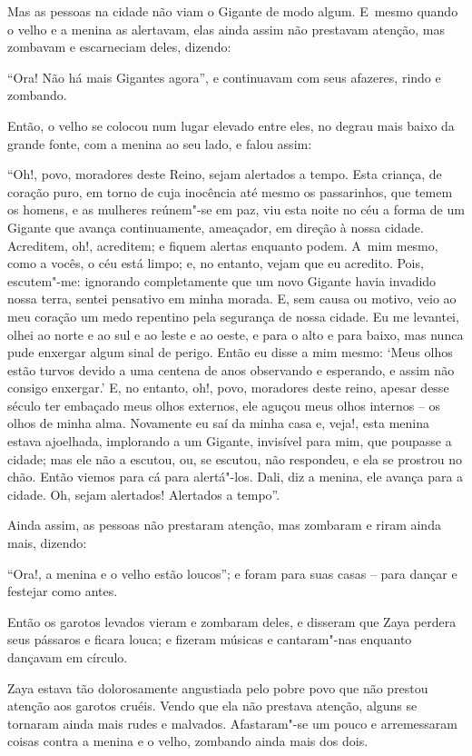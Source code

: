 Mas as pessoas na cidade não viam o Gigante de modo algum. E~mesmo quando o
velho e a menina as alertavam, elas ainda assim não prestavam atenção,
mas zombavam e escarneciam deles, dizendo:

``Ora! Não há mais Gigantes agora'', e continuavam com seus afazeres,
rindo e zombando.

Então, o velho se colocou num lugar elevado entre eles, no degrau mais
baixo da grande fonte, com a menina ao seu lado, e falou assim:

``Oh!, povo, moradores deste Reino, sejam alertados a tempo. Esta
criança, de coração puro, em torno de cuja inocência até mesmo os
passarinhos, que temem os homens, e as mulheres reúnem"-se em paz, viu
esta noite no céu a forma de um Gigante que avança continuamente,
ameaçador, em direção à nossa cidade. Acreditem, oh!, acreditem; e
fiquem alertas enquanto podem. A~mim mesmo, como a vocês, o céu está
limpo; e, no entanto, vejam que eu acredito. Pois, escutem"-me: ignorando
completamente que um novo Gigante havia invadido nossa terra, sentei
pensativo em minha morada. E, sem causa ou motivo, veio ao meu coração
um medo repentino pela segurança de nossa cidade. Eu me levantei, olhei
ao norte e ao sul e ao leste e ao oeste, e para o alto e para baixo, mas
nunca pude enxergar algum sinal de perigo. Então eu disse a mim mesmo:
`Meus olhos estão turvos devido a uma centena de anos observando e
esperando, e assim não consigo enxergar.' E, no entanto, oh!, povo,
moradores deste reino, apesar desse século ter embaçado meus olhos
externos, ele aguçou meus olhos internos -- os olhos de minha alma.
Novamente eu saí da minha casa e, veja!, esta menina estava ajoelhada,
implorando a um Gigante, invisível para mim, que poupasse a cidade; mas
ele não a escutou, ou, se escutou, não respondeu, e ela se prostrou no
chão. Então viemos para cá para alertá"-los. Dali, diz a menina, ele
avança para a cidade. Oh, sejam alertados! Alertados a tempo''.

Ainda assim, as pessoas não prestaram atenção, mas zombaram e riram
ainda mais, dizendo:

``Ora!, a menina e o velho estão loucos''; e foram para suas casas --
para dançar e festejar como antes.

Então os garotos levados vieram e zombaram deles, e disseram que Zaya
perdera seus pássaros e ficara louca; e fizeram músicas e cantaram"-nas
enquanto dançavam em círculo.

Zaya estava tão dolorosamente angustiada pelo pobre povo que não prestou
atenção aos garotos cruéis. Vendo que ela não prestava atenção, alguns
se tornaram ainda mais rudes e malvados. Afastaram"-se um pouco e
arremessaram coisas contra a menina e o velho, zombando ainda mais dos
dois.

